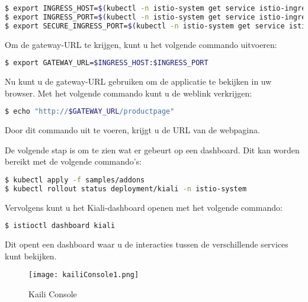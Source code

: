 \begin{lstlisting}[language=bash]
$ export INGRESS_HOST=$(kubectl -n istio-system get service istio-ingressgateway -o jsonpath='{.status.loadBalancer.ingress[0].ip}')
$ export INGRESS_PORT=$(kubectl -n istio-system get service istio-ingressgateway -o jsonpath='{.spec.ports[?(@.name=="http2")].port}')
$ export SECURE_INGRESS_PORT=$(kubectl -n istio-system get service istio-ingressgateway -o jsonpath='{.spec.ports[?(@.name=="https")].port}')
\end{lstlisting}

Om de gateway-URL te krijgen, kunt u het volgende commando uitvoeren:

\begin{lstlisting}[language=bash]
$ export GATEWAY_URL=$INGRESS_HOST:$INGRESS_PORT
\end{lstlisting}

Nu kunt u de gateway-URL gebruiken om de applicatie te bekijken in uw browser. Met het volgende commando kunt u de weblink verkrijgen:

\begin{lstlisting}[language=bash]
$ echo "http://$GATEWAY_URL/productpage"
\end{lstlisting}

Door dit commando uit te voeren, krijgt u de URL van de webpagina.

De volgende stap is om te zien wat er gebeurt op een dashboard. Dit kan worden bereikt met de volgende commando's:

\begin{lstlisting}[language=bash]
$ kubectl apply -f samples/addons
$ kubectl rollout status deployment/kiali -n istio-system
\end{lstlisting}

Vervolgens kunt u het Kiali-dashboard openen met het volgende commando:

\begin{lstlisting}[language=bash]
$ istioctl dashboard kiali
\end{lstlisting}

Dit opent een dashboard waar u de interacties tussen de verschillende services kunt bekijken.

\begin{figure}[b]
	\centering	
	\texttt{[image: kailiConsole1.png]} 
	\caption{Kaili Console} 
	\label{fig:kaili1} 
\end{figure}
\FloatBarrier



